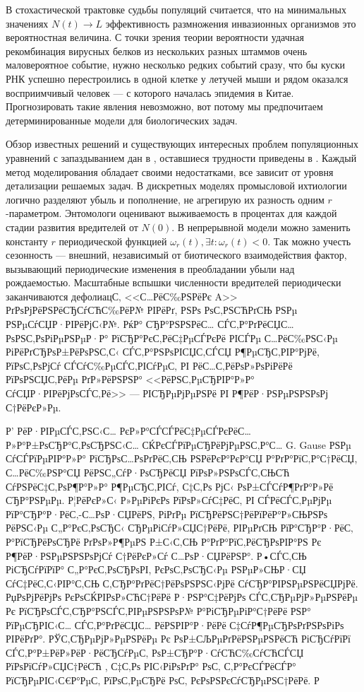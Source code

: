 \documentclass[a4paper,11pt,twoside]{article}
\begin{document}
В стохастической трактовке судьбы популяций считается, что на минимальных значениях $N(t)\to L$ эффективность размножения инвазионных организмов это вероятностная величина. С точки зрения теории вероятности удачная рекомбинация вирусных белков из нескольких разных штаммов очень маловероятное событие, нужно несколько редких событий сразу, что бы куски РНК успешно перестроились в одной клетке у летучей мыши и рядом оказался восприимчивый человек --- с которого началась эпидемия в Китае. Прогнозировать такие явления невозможно, вот потому мы предпочитаем детерминированные модели для биологических задач.

Обзор известных решений и существующих интересных проблем популяционных уравнений с запаздыванием дан в \cite{Obzor}, оставшиеся трудности приведены в \cite{Koles2010}. Каждый метод моделирования обладает своими недостатками, все зависит от уровня детализации решаемых задач. В дискретных моделях промысловой ихтиологии логично разделяют убыль и пополнение, не агрегирую их разность одним $r$-параметром. Энтомологи оценивают выживаемость в процентах для каждой стадии развития вредителей от $N(0)$. В непрерывной модели можно заменить константу $r$ периодической функцией $\omega_r (t), \exists t : \omega_r (t) < 0$. Так можно учесть сезонность --- внешний, независимый от биотического взаимодействия фактор, вызывающий периодические изменения в преобладании убыли над рождаемостью.
Масштабные вспышки численности вредителей периодически заканчиваются дефолиацС‚ <<С…РёС‰РЅРёРє A>> РґРѕРјРёРЅРёСЂСѓСЋС‰РёР№ РІРёРґ, РЅРѕ РѕС‚РЅСЋРґСЊ РЅРµ РЅРµСѓСЏР·РІРёРјС‹Р№. РќР° СЂР°РЅРЅРёС… СЃС‚Р°РґРёСЏС… РѕРЅС‚РѕРіРµРЅРµР·Р° РїСЂР°РєС‚РёС‡РµСЃРєРё РІСЃРµ С…РёС‰РЅС‹Рµ РіРёРґСЂРѕР±РёРѕРЅС‚С‹ СЃС‚Р°РЅРѕРІСЏС‚СЃСЏ Р¶РµСЂС‚РІР°РјРё, РїРѕС‚РѕРјСѓ СЃСѓС‰РµСЃС‚РІСѓРµС‚ РІ РёС…С‚РёРѕР»РѕРіРёРё РїРѕРЅСЏС‚РёРµ РґР»РёРЅРЅР° <<РёРЅС‚РµСЂРІР°Р»Р° СѓСЏР·РІРёРјРѕСЃС‚Рё>> --- РІСЂРµРјРµРЅРё РІ Р¶РёР·РЅРµРЅРЅРѕРј С†РёРєР»Рµ.

Р’ РёР·РІРµСЃС‚РЅС‹С… РєР»Р°СЃСЃРёС‡РµСЃРєРёС… Р»Р°Р±РѕСЂР°С‚РѕСЂРЅС‹С… СЌРєСЃРїРµСЂРёРјРµРЅС‚Р°С… G. Gause РЅРµ СѓСЃРїРµРІР°Р»Р° РїСЂРѕС…РѕРґРёС‚СЊ РЅРёРєР°РєР°СЏ Р°РґР°РїС‚Р°С†РёСЏ, С…РёС‰РЅР°СЏ РёРЅС„СѓР·РѕСЂРёСЏ РїРѕР»РЅРѕСЃС‚СЊСЋ СѓРЅРёС‡С‚РѕР¶Р°Р»Р° Р¶РµСЂС‚РІСѓ, С‡С‚Рѕ РјС‹ РѕР±СЃСѓР¶РґР°Р»Рё СЂР°РЅРµРµ.  Р¦РёРєР»С‹ Р»РµРіРєРѕ РїРѕР»СѓС‡РёС‚ РІ СЃРёСЃС‚РµРјРµ РїР°СЂР°Р·РёС‚-С…РѕР·СЏРёРЅ, РіРґРµ РїСЂРёРЅС†РёРїРёР°Р»СЊРЅРѕ РёРЅС‹Рµ С„Р°РєС‚РѕСЂС‹ СЂРµРіСѓР»СЏС†РёРё, РІРµРґСЊ РїР°СЂР°Р·РёС‚ Р°РїСЂРёРѕСЂРё РґРѕР»Р¶РµРЅ Р±С‹С‚СЊ Р°РґР°РїС‚РёСЂРѕРІР°РЅ Рє Р¶РёР·РЅРµРЅРЅРѕРјСѓ С†РёРєР»Сѓ С…РѕР·СЏРёРЅР°. Р•СЃС‚СЊ РіСЂСѓРїРїР° С„Р°РєС‚РѕСЂРѕРІ, РєРѕС‚РѕСЂС‹Рµ РЅРµР»СЊР·СЏ СѓС‡РёС‚С‹РІР°С‚СЊ С‚СЂР°РґРёС†РёРѕРЅРЅС‹РјРё СѓСЂР°РІРЅРµРЅРёСЏРјРё. РџРѕРјРёРјРѕ РєРѕСЌРІРѕР»СЋС†РёРё Р·РЅР°С‡РёРјРѕ СЃС‚СЂРµРјР»РµРЅРёРµ Рє РїСЂРѕСЃС‚СЂР°РЅСЃС‚РІРµРЅРЅРѕР№ Р°РіСЂРµРіР°С†РёРё РЅР° РїРµСЂРІС‹С… СЃС‚Р°РґРёСЏС… РёРЅРІР°Р·РёРё С‡СѓР¶РµСЂРѕРґРЅРѕРіРѕ РІРёРґР°. РЎС‚СЂРµРјР»РµРЅРёРµ Рє РѕР±СЉРµРґРёРЅРµРЅРёСЋ РіСЂСѓРїРї СЃС‚Р°Р±РёР»РёР·РёСЂСѓРµС‚ РѕР±СЂР°Р·СѓСЋС‰СѓСЋСЃСЏ РїРѕРїСѓР»СЏС†РёСЋ \cite{Taksis}, С‡С‚Рѕ РІС‹РіРѕРґР° РѕС‚ С‚Р°РєСЃРёСЃР° РїСЂРµРІС‹С€Р°РµС‚ РїРѕС‚РµСЂРё РѕС‚ РєРѕРЅРєСѓСЂРµРЅС†РёРё. Р
\end{document}
